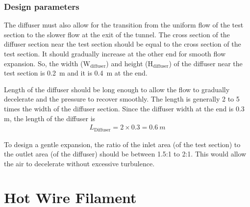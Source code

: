 \subsubsection{Design parameters}
The diffuser must also allow for the transition from the uniform flow of the test section to the slower flow at the exit of the tunnel. The cross section of the diffuser section near the test section should be equal to the cross section of the test section. It should gradually increase at the other end for smooth flow expansion.
So, the width (W$_{\text{diffuser}}$) and height (H${_\text{diffuser}}$) of the diffuser near the test section is 0.2~m and it is 0.4~m at the end. 

Length of the diffuser should be long enough to allow the flow to gradually decelerate and the pressure to recover smoothly. The length is generally 2 to 5 times the width of the diffuser section. Since the diffuser width at the end is 0.3 m, the length of the diffuser is
\begin{align}
    L_{\text{Diffuser}}= 2 \times 0.3 = 0.6~m\nonumber
\end{align}



To design a gentle expansion, the ratio of the inlet area (of the test section) to the outlet area (of the diffuser) should be between 1.5:1 to 2:1. This would allow the air to decelerate without excessive turbulence.

\section{Hot Wire Filament}


